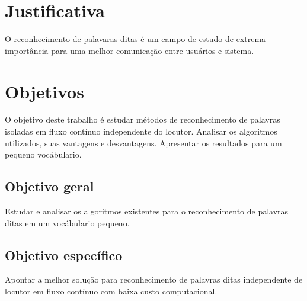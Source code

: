 \section{Justificativa}
\label{sec:justificativa}



O reconhecimento de palavaras ditas é um campo de estudo de extrema importância para uma melhor comunicação entre usuários e sistema.
\section{Objetivos}
\label{sec:objetivos}

O objetivo deste trabalho é estudar métodos de reconhecimento de palavras isoladas em fluxo contínuo independente do locutor. Analisar os algoritmos utilizados, suas vantagens e desvantagens. Apresentar os resultados para um pequeno vocábulario.
\subsection{Objetivo geral}
\label{subsec:objetivogeral}
Estudar e analisar os algoritmos existentes para o reconhecimento de palavras  ditas em um vocábulario pequeno.
\subsection{Objetivo específico}
\label{subsec:objetivoespecifico}
Apontar a melhor solução para reconhecimento de palavras ditas independente de locutor em fluxo contínuo com baixa custo computacional.


